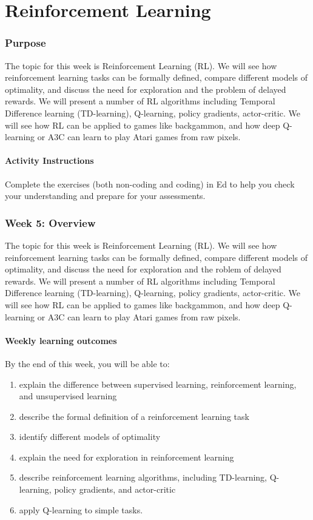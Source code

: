 \documentclass[11pt]{article}
\begin{document}
\part{Reinforcement Learning}\label{part:reinforcement-learning}

\section{Purpose}\label{sec:purpose}
The topic for this week is Reinforcement Learning (RL).
We will see how reinforcement learning tasks can be formally defined, compare
different models of optimality, and discuss the need for exploration and the
problem of delayed rewards.
We will present a number of RL algorithms including Temporal Difference
learning (TD-learning), Q-learning, policy gradients, actor-critic.
We will see how RL can be applied to games like backgammon, and how deep
Q-learning or A3C can learn to play Atari games from raw pixels.

\subsection{Activity Instructions}\label{subsec:activity-instructions}
Complete the exercises (both non-coding and coding) in Ed to help you check
your understanding and prepare for your assessments.

\section{Week 5: Overview}\label{sec:week-5:-overview}
The topic for this week is Reinforcement Learning (RL).
We will see how reinforcement learning tasks can be formally defined, compare
different models of optimality, and discuss the need for exploration and the
roblem of delayed rewards.
We will present a number of RL algorithms including Temporal Difference
learning (TD-learning), Q-learning, policy gradients, actor-critic.
We will see how RL can be applied to games like backgammon, and how deep
Q-learning or A3C can learn to play Atari games from raw pixels.

\subsection{Weekly learning outcomes}\label{subsec:weekly-learning-outcomes}
By the end of this week, you will be able to:

\begin{enumerate}
  \item explain the difference between supervised learning, reinforcement learning, and unsupervised learning
  \item describe the formal definition of a reinforcement learning task
  \item identify different models of optimality
  \item explain the need for exploration in reinforcement learning
  \item describe reinforcement learning algorithms, including TD-learning, Q-learning, policy gradients, and actor-critic
  \item apply Q-learning to simple tasks.
\end{enumerate}
\end{document}
